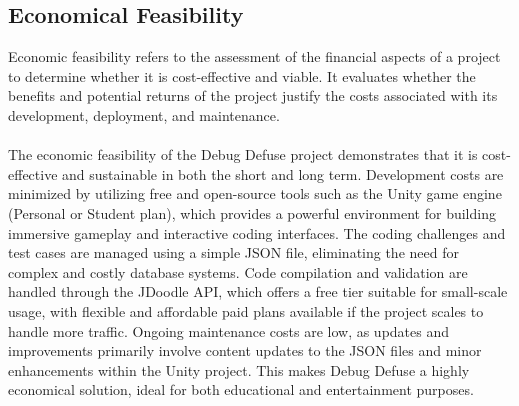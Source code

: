  \subsection{Economical Feasibility}
 Economic feasibility refers to the assessment of the financial aspects of a project to determine whether it is cost-effective and viable. It evaluates whether the benefits and potential returns of the project justify the costs associated with its development, deployment, and maintenance.\\\\
 The economic feasibility of the Debug Defuse project demonstrates that it is cost-effective and sustainable in both the short and long term. Development costs are minimized by utilizing free and open-source tools such as the Unity game engine (Personal or Student plan), which provides a powerful environment for building immersive gameplay and interactive coding interfaces. The coding challenges and test cases are managed using a simple JSON file, eliminating the need for complex and costly database systems. Code compilation and validation are handled through the JDoodle API, which offers a free tier suitable for small-scale usage, with flexible and affordable paid plans available if the project scales to handle more traffic. Ongoing maintenance costs are low, as updates and improvements primarily involve content updates to the JSON files and minor enhancements within the Unity project. This makes Debug Defuse a highly economical solution, ideal for both educational and entertainment purposes.


 
